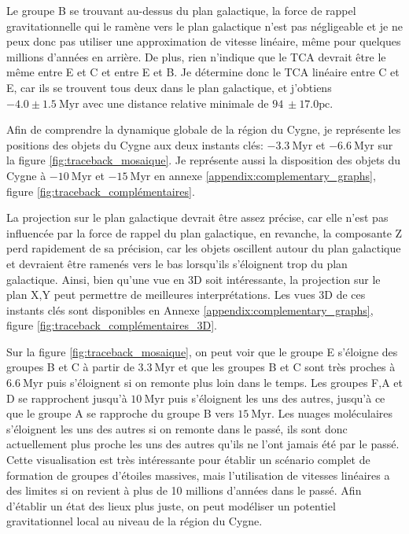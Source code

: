 \documentclass[a4paper, 11pt]{article}
\begin{document}
	Le groupe B se trouvant au-dessus du plan galactique, la force de rappel gravitationnelle qui le ramène vers le plan galactique n'est pas négligeable et je ne peux donc pas utiliser une approximation de vitesse linéaire, même pour quelques millions d'années en arrière. De plus, rien n'indique que le TCA devrait être le même entre E et C et entre E et B. Je détermine donc le TCA linéaire entre C et E, car ils se trouvent tous deux dans le plan galactique, et j'obtiens $-4.0 \pm 1.5 \ \mathrm{Myr}$ avec une distance relative minimale de $94 \ \pm 17.0 \mathrm{pc}$.
	
	Afin de comprendre la dynamique globale de la région du Cygne, je représente les positions des objets du Cygne aux deux instants clés: $-3.3 \ \mathrm{Myr}$ et $-6.6 \ \mathrm{Myr}$ sur la figure \ref{fig:traceback_mosaique}. Je représente aussi la disposition des objets du Cygne à $-10 \ \mathrm{Myr}$ et $-15 \ \mathrm{Myr}$ en annexe \ref{appendix:complementary_graphs}, figure \ref{fig:traceback_complémentaires}.
	
	La projection sur le plan galactique devrait être assez précise, car elle n'est pas influencée par la force de rappel du plan galactique, en revanche, la composante Z perd rapidement de sa précision, car les objets oscillent autour du plan galactique et devraient être ramenés vers le bas lorsqu'ils s'éloignent trop du plan galactique. Ainsi, bien qu'une vue en 3D soit intéressante, la projection sur le plan X,Y peut permettre de meilleures interprétations. Les vues 3D de ces instants clés sont disponibles en Annexe \ref{appendix:complementary_graphs}, figure \ref{fig:traceback_complémentaires_3D}.
	
	Sur la figure \ref{fig:traceback_mosaique}, on peut voir que le groupe E s'éloigne des groupes B et C à partir de $3.3 \ \mathrm{Myr}$ et que les groupes B et C sont très proches à $6.6 \ \mathrm{Myr}$ puis s'éloignent si on remonte plus loin dans le temps. Les groupes F,A et D se rapprochent jusqu'à $10 \ \mathrm{Myr}$ puis s'éloignent les uns des autres, jusqu'à ce que le groupe A se rapproche du groupe B vers $15 \ \mathrm{Myr}$. Les nuages moléculaires s'éloignent les uns des autres si on remonte dans le passé, ils sont donc actuellement plus proche les uns des autres qu'ils ne l'ont jamais été par le passé.
	Cette visualisation est très intéressante pour établir un scénario complet de formation de groupes d'étoiles massives, mais l'utilisation de vitesses linéaires a des limites si on revient à plus de 10 millions d'années dans le passé. Afin d'établir un état des lieux plus juste, on peut modéliser un potentiel gravitationnel local au niveau de la région du Cygne.
	
\end{document}
